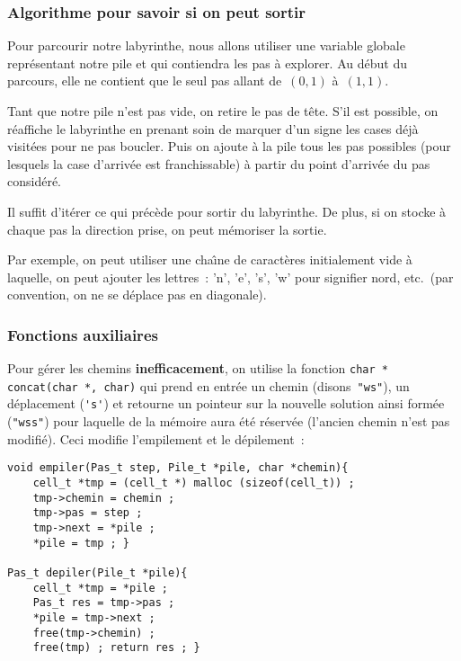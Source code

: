 \begin{frame}
  \frametitle{Algorithme pour savoir si on peut sortir}%
  Pour  parcourir  notre labyrinthe, nous   allons utiliser une variable
  globale   repr\'esentant  notre pile et qui    contiendra  les pas \`a
  explorer.   Au d\'ebut du parcours, elle  ne  contient que le seul pas
  allant de~${(0,1)}$ \`a~${(1,1)}$.
  \par
  Tant que notre pile n'est pas vide, on retire le pas de t\^ete. S'il
  est possible, on r\'eaffiche le labyrinthe en prenant soin de
  marquer d'un signe les cases d\'ej\`a visit\'ees pour ne pas
  boucler.  Puis on ajoute \`a la pile tous les pas possibles (pour
  lesquels la case d'arriv\'ee est franchissable) \`a partir du point
  d'arriv\'ee du pas consid\'er\'e.
  \par
  Il suffit d'it\'erer ce qui pr\'ec\`ede pour sortir du labyrinthe.
  De plus, si on stocke \`a chaque pas la direction prise, on peut
  m\'emoriser la sortie.
  \par
  Par exemple, on peut utiliser une cha\^\i{}ne de caract\`eres
  initialement vide \`a laquelle, on peut ajouter les lettres~: 'n',
  'e', 's', 'w' pour signifier nord, etc.\ (par convention, on ne se
  d\'eplace pas en diagonale).
\end{frame}
\begin{frame}[fragile]
  \frametitle{Fonctions auxiliaires}%
  Pour g\'erer les chemins \textbf{inefficacement}, on utilise la fonction 
  \verb?char * concat(char *, char)? qui prend en entr\'ee un chemin
  (disons~\verb?"ws"?), un d\'eplacement (\verb?'s'?) et retourne un
  pointeur sur la nouvelle solution ainsi form\'ee (\verb?"wss"?) pour
  laquelle de la m\'emoire aura \'et\'e r\'eserv\'ee (l'ancien
  chemin n'est pas modifi\'e). Ceci modifie l'empilement et le d\'epilement~:
\begin{verbatim}
void empiler(Pas_t step, Pile_t *pile, char *chemin){
    cell_t *tmp = (cell_t *) malloc (sizeof(cell_t)) ;
    tmp->chemin = chemin ;
    tmp->pas = step ; 
    tmp->next = *pile ;
    *pile = tmp ; }

Pas_t depiler(Pile_t *pile){
    cell_t *tmp = *pile ;
    Pas_t res = tmp->pas ;
    *pile = tmp->next ;
    free(tmp->chemin) ;
    free(tmp) ; return res ; }
\end{verbatim}
\end{frame}
